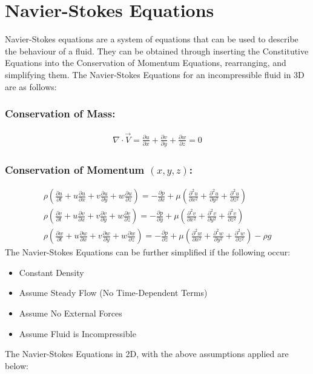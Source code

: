 \documentclass[class=report, crop=false, 12pt,a4paper]{standalone}
\begin{document}
\section{Navier-Stokes Equations}
Navier-Stokes equations are a system of equations that can be used to describe the behaviour of a fluid. They can be obtained through inserting the Constitutive Equations into the Conservation of Momentum Equations, rearranging, and simplifying them. The Navier-Stokes Equations for an incompressible fluid in 3D are as follows:
\subsubsection{Conservation of Mass:}
\begin{gather}
  \nabla \cdot \vec{V} = \frac{\partial u}{\partial x} + \frac{\partial v}{\partial y} + \frac{\partial w}{\partial z} = 0
\end{gather}
\subsubsection{Conservation of Momentum $(x,y,z)$:}
\begin{gather}
  \rho \left(\frac{\partial u}{\partial t} + u\frac{\partial u}{\partial x} + v\frac{\partial u}{\partial y} + w\frac{\partial u}{\partial z} \right) = -\frac{\partial p}{\partial x} + \mu \left(\frac{\partial^2 u}{\partial x^2} + \frac{\partial^2 u}{\partial y^2} + \frac{\partial^2 u}{\partial z^2} \right) \\
  \rho \left(\frac{\partial v}{\partial t} + u\frac{\partial v}{\partial x} + v\frac{\partial v}{\partial y} + w\frac{\partial v}{\partial z} \right) = -\frac{\partial p}{\partial y} + \mu \left(\frac{\partial^2 v}{\partial x^2} + \frac{\partial^2 v}{\partial y^2} + \frac{\partial^2 v}{\partial z^2} \right) \\
  \rho \left(\frac{\partial w}{\partial t} + u\frac{\partial w}{\partial x} + v\frac{\partial w}{\partial y} + w\frac{\partial w}{\partial z} \right) = -\frac{\partial p}{\partial z} + \mu \left(\frac{\partial^2 w}{\partial x^2} + \frac{\partial^2 w}{\partial y^2} + \frac{\partial^2 w}{\partial z^2} \right) - \rho g
\end{gather}
The Navier-Stokes Equations can be further simplified if the following occur:
\begin{itemize}
  \item Constant Density
  \item Assume Steady Flow (No Time-Dependent Terms)
  \item Assume No External Forces
  \item Assume Fluid is Incompressible
\end{itemize}
The Navier-Stokes Equations in 2D, with the above assumptions applied are below:
\end{document}
